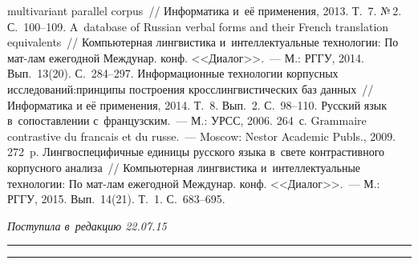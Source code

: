 {\begin{multicols}{2}
{{\begin{thebibliography}{99}
multivariant parallel corpus~// Информатика и~её применения, 2013. Т.~7. №\,2. 
С.~100--109.
 A~database of Russian verbal forms and their French translation 
equivalents~// Компьютерная лингвистика и~интеллектуальные технологии: По мат-лам 
ежегодной Междунар. конф. <<Диалог>>.~--- М.: РГГУ, 2014. Вып.~13(20).
С.~284--297.
 Инфор\-ма\-ционные технологии корпусных 
исследований:\linebreak принципы построения кросслингвистических баз данных~// Информатика 
и её применения, 2014. Т.~8. Вып.~2. С.~98--110.
 Русский язык в~сопоставлении с~французским.~--- М.: УРСС, 2006. 264~с.
 Grammaire contrastive du francais et du russe.~--- Moscow: Nestor 
Academic Publs., 2009. 272~p.
 Лингвоспецифичные единицы русского языка в~свете 
контрастивного корпусного анализа~// Компьютерная лингвистика и~интеллектуальные 
технологии: По мат-лам ежегодной Междунар. конф. <<Диалог>>.~--- М.: РГГУ, 2015. 
Вып.~14(21). Т.~1. С.~683--695.

 \end{thebibliography}

 }
 }

\end{multicols}

\vspace*{-3pt}

\hfill{\small\textit{Поступила в~редакцию 22.07.15}}


\vspace*{12pt}

\hrule

\vspace*{2pt}

\hrule


\def\tit{GOAL-ORIENTED PROCESSES OF~CROSS-LINGUAL EXPERT KNOWLEDGE CREATION:
SEMIOTIC FOUNDATIONS FOR~MODELING}

\def\titkol{Goal-oriented processes of cross-lingual expert knowledge creation:
Semiotic foundations for modeling}

\def\aut{I.\,M.~Zatsman}

}
